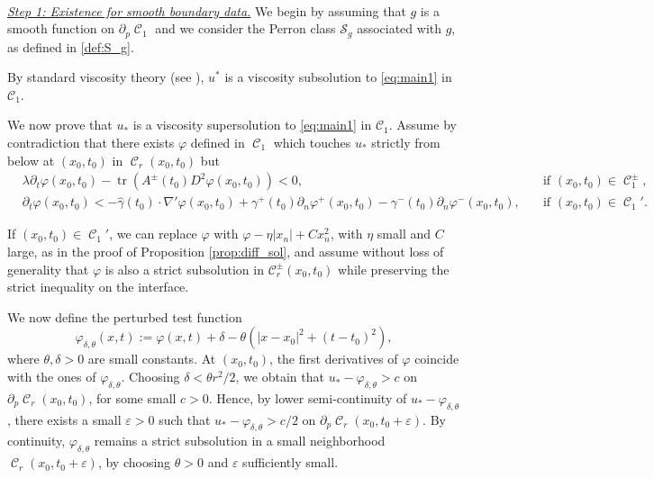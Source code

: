 \documentclass[12pt]{article}
\makeatletter
\newenvironment{customproof}[1]{%
  \par\pushQED{\qed}%
  \normalfont\topsep6pt \trivlist
  \item[\hskip\labelsep\itshape
    Proof of #1\@addpunct{.}]\ignorespaces
}{%
  \popQED\endtrivlist\@endpefalse
}
\numberwithin{Theorem}{section}
\theoremstyle{definition}
\theoremstyle{remark}
\numberwithin{equation}{section}
\DeclareMathOperator{\C}{\mathcal{C}}
\DeclareMathOperator*{\tr}{tr}
\newcommand{\p}{\partial}
\newcommand{\eps}{\varepsilon}
\makeatother
\begin{document}
\begin{customproof}{Theorem \ref{thm:existence}} ~

\underline{\textit{Step 1: Existence for smooth boundary data.}}
We begin by assuming that $g$ is a smooth function on $\p_p \C_1$ and we consider the Perron class $\mathcal{S}_g$ associated with $g$, as defined in \eqref{def:S_g}.


By standard viscosity theory (see  \cite[Lemma 4.18]{jesus2026fully}),  $u^*$ is a viscosity subsolution to \eqref{eq:main1} in $\mathcal{C}_1$. 

We now prove that $u_*$ is a viscosity supersolution to \eqref{eq:main1} in $\mathcal{C}_1$. 
Assume by contradiction that there exists $\varphi$ defined in $\C_1$ which touches $u_*$ strictly from below at $(x_0,t_0)$ in $\C_r(x_0,t_0)$ but
\begin{equation*}
 \begin{aligned}
     & \lambda \p_t \varphi(x_0,t_0) - \tr(A^{\pm}(t_0) D^2 \varphi(x_0,t_0)) < 0, & \quad \text{if }(x_0,t_0) \in \C_{1}^\pm,  \\
        &\p_t \varphi(x_0,t_0) < -\hat{\gamma}(t_0) \cdot  \nabla' \varphi(x_0,t_0)  + \gamma^+( t_0) \p_n \varphi^+(x_0,t_0) - \gamma^-(t_0) \p_n \varphi^-(x_0,t_0),  & \quad \text{if }(x_0,t_0) \in \C_{1}'.
 \end{aligned}
\end{equation*}

 
If $(x_0,t_0)\in \C_1'$, we can replace $\varphi$ with $\varphi-\eta|x_n| + C x_n^2$, with $\eta$ small and $C$ large, as in the proof of Proposition \ref{prop:diff_sol}, and assume without loss of generality that $\varphi$
is also a strict subsolution in $\mathcal{C}_r^\pm(x_0,t_0)$ while preserving the strict inequality on the interface.

We now define the perturbed test function
\[
\varphi_{\delta,\theta}(x,t) := \varphi(x,t) + \delta - \theta \left( |x - x_0|^2 + (t - t_0)^2 \right),
\]
where $\theta, \delta > 0$ are small constants. At $(x_0,t_0)$, the first derivatives of $\varphi$ coincide with the ones of $\varphi_{\delta,\theta}$.  
Choosing $\delta < \theta r^2/2$, we obtain that $u_*-\varphi_{\delta,\theta}>c$ on $\partial_p \C_r(x_0,t_0)$, for some small $c>0$. Hence, by lower semi-continuity of $u_*-\varphi_{\delta,\theta}$, there exists a small $\varepsilon>0$ such that $u_*-\varphi_{\delta,\theta}>c/2$ on $\partial_p \C_r(x_0,t_0+\varepsilon)$. By continuity, $\varphi_{\delta,\theta}$ remains a strict subsolution in a small neighborhood $\C_r(x_0,t_0+\eps)$, by choosing $\theta > 0$ and $\eps$  sufficiently small.



\end{customproof}
\end{document}
